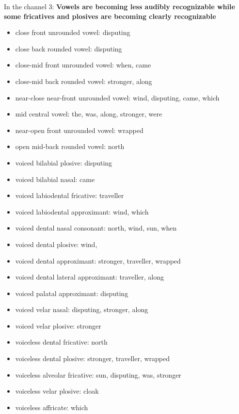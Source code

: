 \documentclass{../labbook}
\begin{document}
\begin{solution}
In the channel 3: \textbf{Vowels are becoming less audibly recognizable while some fricatives and plosives are becoming clearly recognizable}
\begin{itemize}
    \item close front unrounded vowel: disputing
    \item close back rounded vowel: disputing
    \item close-mid front unrounded vowel: when, came
    \item close-mid back rounded vowel: stronger, along
    \item near-close near-front unrounded vowel: wind, disputing, came, which
    \item mid central vowel: the, was, along, stronger, were
    \item near-open front unrounded vowel: wrapped 
    \item open mid-back rounded vowel: north
    \item voiced bilabial plosive: disputing
    \item voiced bilabial nasal: came
    \item voiced labiodental fricative: traveller
    \item voiced labiodental approximant: wind, which
    \item voiced dental nasal consonant: north, wind, sun, when
    \item voiced dental plosive: wind,
    \item voiced dental approximant: stronger, traveller, wrapped
    \item voiced dental lateral approximant: traveller, along
    \item voiced palatal approximant: disputing
    \item voiced velar nasal: disputing, stronger, along
    \item voiced velar plosive: stronger
    \item voiceless dental fricative: north
    \item voiceless dental plosive: stronger, traveller, wrapped 
    \item voiceless alveolar fricative: sun, disputing, was, stronger
    \item voiceless velar plosive: cloak
    \item voiceless affricate: which
\end{itemize}


\end{solution}
\end{document}
